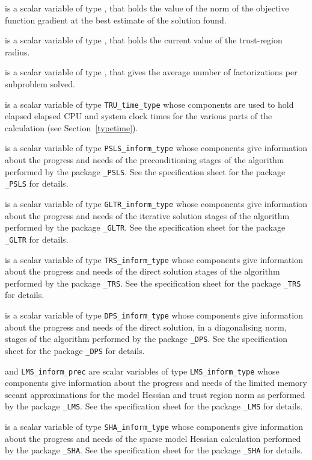 \documentclass{galahad}
\newcommand{\packagename}{TRU}
\begin{document}
\begin{description}
 is a scalar variable of type \realdp, that holds the
value of the norm of the objective function gradient at the best estimate
of the solution found.

 is a scalar variable of type \realdp, that holds
the current value of the trust-region radius.

 is a scalar variable of type \realdp, that
gives the average number of factorizations per subproblem solved.

 is a scalar variable of type {\tt \packagename\_time\_type}
whose components are used to hold elapsed elapsed CPU and system clock
times for the various parts of the calculation (see Section~\ref{typetime}).


 is a scalar variable of type
{\tt PSLS\_inform\_type}
whose components give information about the progress and needs
of the preconditioning stages of the algorithm performed by the package
{\tt \libraryname\_PSLS}.
See the specification sheet for the package
{\tt \libraryname\_PSLS}
for details.

 is a scalar variable of type
{\tt GLTR\_inform\_type}
whose components give information about the progress and needs
of the iterative solution stages of the algorithm performed by the package
{\tt \libraryname\_GLTR}.
See the specification sheet for the package
{\tt \libraryname\_GLTR}
for details.

 is a scalar variable of type
{\tt TRS\_inform\_type}
whose components give information about the progress and needs
of the direct solution stages of the algorithm performed by the package
{\tt \libraryname\_TRS}.
See the specification sheet for the package
{\tt \libraryname\_TRS}
for details.

 is a scalar variable of type
{\tt DPS\_inform\_type}
whose components give information about the progress and needs
of the direct solution, in a diagonalising norm,
stages of the algorithm performed by the package
{\tt \libraryname\_DPS}.
See the specification sheet for the package
{\tt \libraryname\_DPS}
for details.

 and {\tt LMS\_inform\_prec}
are scalar variables of type
{\tt LMS\_inform\_type}
whose components give information about the progress and needs
of the limited memory secant approximations for the model Hessian
and trust region norm as performed by the package
{\tt \libraryname\_LMS}.
See the specification sheet for the package
{\tt \libraryname\_LMS}
for details.

 is a scalar variable of type
{\tt SHA\_inform\_type}
whose components give information about the progress and needs
of the sparse model Hessian calculation performed by the package
{\tt \libraryname\_SHA}.
See the specification sheet for the package
{\tt \libraryname\_SHA}
for details.

\end{description}
\end{document}
